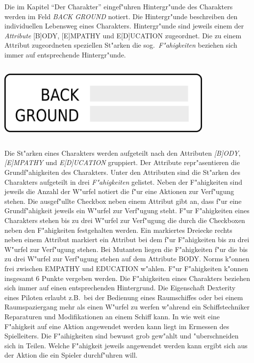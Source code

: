 \begin{column}[l]{0.52}
    Die im Kapitel "`Der Charakter"' eingef"uhren Hintergr"unde des Charakters werden im Feld \emph{BACK GROUND} notiert. Die Hintergr"unde beschreiben den individuellen Lebensweg eines Charakters. Hintergr"unde sind jeweils einem der \emph{Attribute} [B]ODY, [E]MPATHY und E[D]UCATION zugeordnet. Die zu einem Attribut zugeordneten speziellen St"arken die sog.~\emph{F"ahigkeiten} beziehen sich immer auf entsprechende Hintergr"unde.
\end{column}
\begin{column}[r]{0.48}
    \centering
    \includegraphics[width=0.80\textwidth]{images/character_background}    
\end{column}

Die St"arken eines Charakters werden aufgeteilt nach den Attributen \emph{[B]ODY}, \emph{[E]MPATHY} und \emph{E[D]UCATION} gruppiert. Der Attribute repr"asentieren die Grundf"ahigkeiten des Charakters. Unter den Attributen sind die St"arken des Charakters aufgeteilt in drei \emph{F"ahigkeiten} gelistet. Neben der F"ahigkeiten sind jeweils die Anzahl der W"urfel notiert die f"ur eine Aktionen zur Verf"ugung stehen. Die ausgef"ullte Checkbox neben einem Attribut gibt an, dass f"ur eine Grundf"ahigkeit jeweils ein W"urfel zur Verf"ugung steht. F"ur F"ahigkeiten eines Charakters stehen bis zu drei W"urfel zur Verf"ugung die durch die Checkboxen neben den F"ahigkeiten festgehalten werden. Ein markiertes Dreiecke rechts neben einem Attribut markiert ein Attribut bei dem f"ur F"ahigkeiten bis zu drei W"urfel zur Verf"ugung stehen. Bei Mutanten liegen die F"ahigkeiten f"ur die bis zu drei W"urfel zur Verf"ugung stehen auf dem Attribute BODY. Norms k"onnen frei zwischen EMPATHY und EDUCATION w"ahlen. F"ur F"ahigkeiten k"onnen insgesamt 6 Punkte vergeben werden.
Die F"ahigkeiten eines Charakters beziehen sich immer auf einen entsprechenden Hintergrund. Die Eigenschaft Dexterity eines Piloten erlaubt z.B.~bei der Bedienung eines Raumschiffes oder bei einem Raumspaziergang mehr als einen W"urfel zu werfen w"ahrend ein Schiffstechniker Reparaturen und Modifikationen an einem Schiff kann. In wie weit eine F"ahigkeit auf eine Aktion angewendet werden kann liegt im Ermessen des Spielleiters. Die F"aihigkeiten sind bewusst grob gew"ahlt und "uberschneiden sich in Teilen. Welche F"ahigkeit jeweils angewendet werden kann ergibt sich aus der Aktion die ein Spieler durchf"uhren will.

